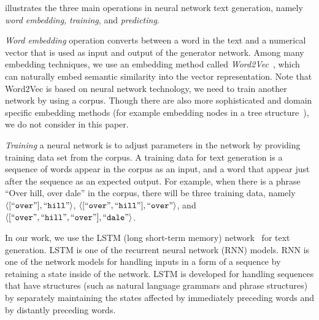 \documentclass[PRO,english]{ipsj}
\begin{document}
 illustrates the three main operations in neural network text generation, namely \emph{word embedding,} \emph{training}, and \emph{predicting}.

\emph{Word embedding} operation converts between a word in the text and a numerical vector that is used as input and output of the generator network.  Among many embedding techniques, we use an embedding method called \emph{Word2Vec}~\cite{word2vec}, which can naturally embed semantic similarity into the vector representation.  Note that Word2Vec is based on neural network technology, we need to train another network by using a corpus.
Though there are also more sophisticated and domain specific embedding methods (for example embedding nodes in a tree structure~\cite{ASTToken2Vec}), we do not consider in this paper.  

\emph{Training} a neural network is to adjust parameters in the network by providing training data set from the corpus.  A training data for text generation is a sequence of words appear in the corpus as an input, and a word that appear just after the sequence as an expected output.  For example, when there is a phrase ``Over hill, over dale'' in the corpus, there will be three training data, namely
$\langle[\mbox{``\texttt{over}''}], \mbox{``\texttt{hill}''}\rangle$, 
$\langle[\mbox{``\texttt{over}''}, \mbox{``\texttt{hill}''}], \mbox{``\texttt{over}''}\rangle$,  and
$\langle[\mbox{``\texttt{over}''}, \mbox{``\texttt{hill}''},\mbox{``\texttt{over}''}], \mbox{``\texttt{dale}''}\rangle$.

In our work, we use the LSTM (long short-term memory) network~\cite{LSTM} for text generation.  LSTM is one of the recurrent neural network (RNN) models.  RNN is one of the network models for handling inputs in a form of a sequence by retaining a state inside of the network.  LSTM is developed for handling sequences that have structures (such as natural language grammars and phrase structures) by separately maintaining the states affected by immediately preceding words and by distantly preceding words.

\end{document}

